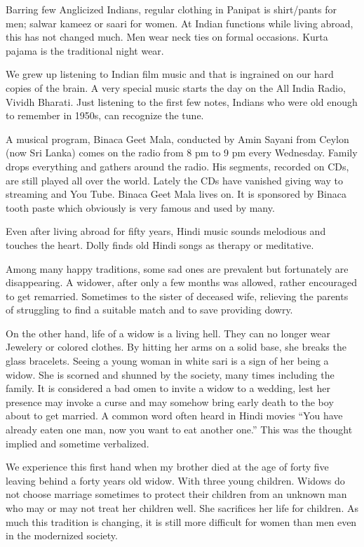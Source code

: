 Barring few Anglicized Indians, regular clothing in Panipat is shirt/pants
for men; salwar kameez or saari for women. At Indian functions while
living abroad, this has not changed much. Men wear neck ties on formal
occasions. Kurta pajama is the traditional night wear. 

We grew up listening to Indian film music and that is ingrained on our
hard copies of the brain. A very special music starts the day on the All
India Radio, Vividh Bharati. Just listening to the first few notes,
Indians who were old enough to remember in 1950s, can recognize the tune. 

A musical program, Binaca Geet Mala, conducted by Amin Sayani from Ceylon
(now Sri Lanka) comes on the radio from 8 pm to 9 pm every Wednesday.
Family drops everything and gathers around the radio. His segments,
recorded on CDs, are still played all over the world. Lately the CDs have
vanished giving way to streaming and You Tube. Binaca Geet Mala lives on.
It is sponsored by Binaca tooth paste which obviously is very famous and
used by many. 

Even after living abroad for fifty years, Hindi music sounds melodious and
touches the heart. Dolly finds old Hindi songs as therapy or meditative. 

Among many happy traditions, some sad ones are prevalent but fortunately
are disappearing. A widower, after only a few months was allowed, rather
encouraged to get remarried. Sometimes to the sister of deceased wife,
relieving the parents of struggling to find a suitable match and to save
providing dowry. 

On the other hand, life of a widow is a living hell. They can no longer
wear Jewelery or colored clothes. By hitting her arms on a solid base, she
breaks the glass bracelets. Seeing a young woman in white sari is a sign
of her being a widow. She is scorned and shunned by the society, many
times including the family. It is considered a bad omen to invite a widow
to a wedding, lest her presence may invoke a curse and may somehow bring
early death to the boy about to get married. A common word often heard in
Hindi movies “You have already eaten one man, now you want to eat another
one.” This was the thought implied and sometime verbalized. 

We experience this first hand when my brother died at the age of forty
five leaving behind a forty years old widow. With three young children.
Widows do not choose marriage sometimes to protect their children from an
unknown man who may or may not treat her children well. She sacrifices her
life for children. As much this tradition is changing, it is still more
difficult for women than men even in the modernized society. 

